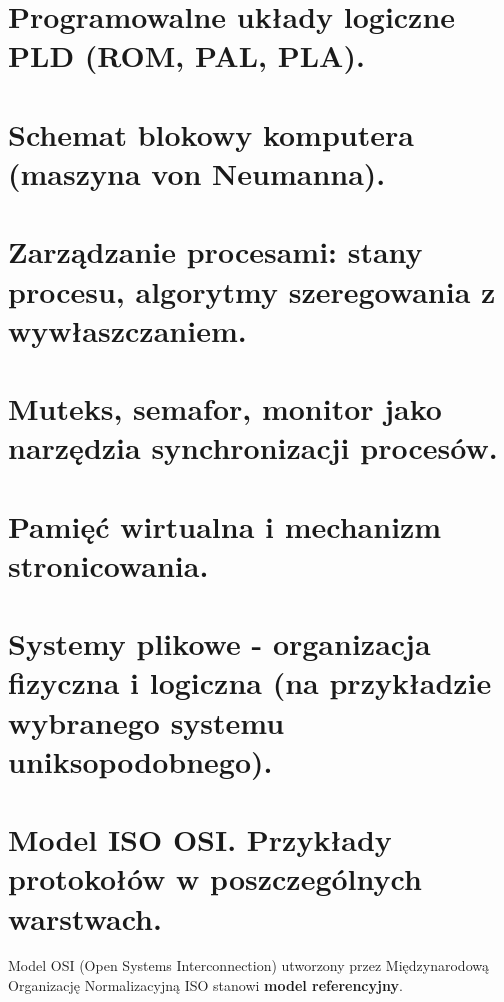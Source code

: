 \documentclass[12pt]{article}
\begin{document}
    
    \newpage
    
    \section{Programowalne układy logiczne PLD (ROM, PAL, PLA).}
    \section{Schemat blokowy komputera (maszyna von Neumanna).}
    \section{Zarządzanie procesami: stany procesu, algorytmy szeregowania z wywłaszczaniem.}
    \section{Muteks, semafor, monitor jako narzędzia synchronizacji procesów.}
    \section{Pamięć wirtualna i mechanizm stronicowania.}
    \section{Systemy plikowe - organizacja fizyczna i logiczna (na przykładzie wybranego systemu uniksopodobnego).}

    \newpage

    \section{Model ISO OSI. Przykłady protokołów w poszczególnych warstwach.}
    Model OSI (Open Systems Interconnection) utworzony przez Międzynarodową Organizację Normalizacyjną ISO stanowi
    \textbf{model referencyjny}.
\end{document}

